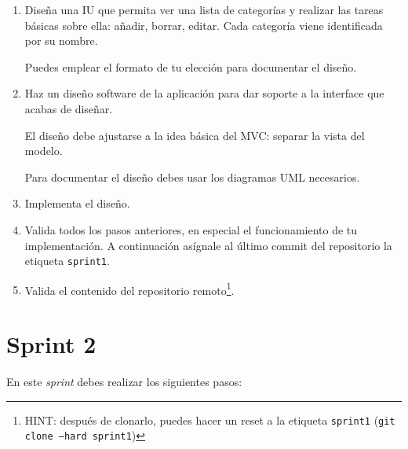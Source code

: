 \documentclass[11pt,a4paper]{article}
\begin{document}
\begin{enumerate}
\item Diseña una IU que permita ver una lista de categorías y realizar
  las tareas básicas sobre ella: añadir, borrar, editar. Cada
  categoría viene identificada por su nombre.

  Puedes emplear el formato de tu elección para documentar el diseño.

\item Haz un diseño software de la aplicación para dar soporte a la
  interface que acabas de diseñar.

  El diseño debe ajustarse a la idea básica del MVC: separar la vista
  del modelo.

  Para documentar el diseño debes usar los diagramas UML necesarios.

\item Implementa el diseño.

\item Valida todos los pasos anteriores, en especial el funcionamiento
  de tu implementación. A continuación asígnale al último commit del
  repositorio la etiqueta \texttt{sprint1}.

\item Valida el contenido del repositorio remoto\footnote{HINT:
    después de clonarlo, puedes hacer un reset a la etiqueta
    \texttt{sprint1} (\texttt{git clone --hard sprint1})}.
\end{enumerate}


\section{Sprint 2}

En este \emph{sprint} debes realizar los siguientes pasos:
\end{document}
